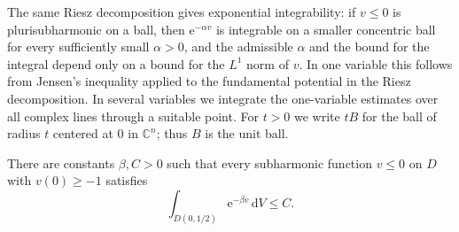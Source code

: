The same Riesz decomposition gives exponential integrability: if $v\leq0$ is plurisubharmonic on a ball, then $\mathrm e^{-\alpha v}$ is integrable on a smaller concentric ball for every sufficiently small $\alpha>0$, and the admissible $\alpha$ and the bound for the integral depend only on a bound for the $L^1$ norm of $v$. In one variable this follows from Jensen's inequality applied to the fundamental potential in the Riesz decomposition. In several variables we integrate the one-variable estimates over all complex lines through a suitable point. For $t>0$ we write $tB$ for the ball of radius $t$ centered at $0$ in $\mathbb C^n$; thus $B$ is the unit ball.

\begin{lemma}\label{lem:negative-subharmonic-disc-exponential}
There are constants $\beta,C>0$ such that every subharmonic function $v\leq0$ on $D$ with $v(0)\geq-1$ satisfies
\[
 \int_{D(0,1/2)}\mathrm e^{-\beta v}\,\mathrm dV\leq C.
\]
\end{lemma}
